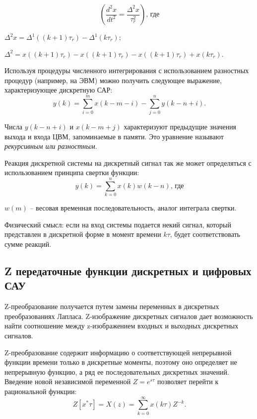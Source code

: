 \documentclass[unicode, 12pt, a4paper, oneside]{article}
\begin{document}
\begin{equation}
\left( \dfrac{d^2x}{dt^2} = \dfrac{\Delta^2x}{\tau^2_r} \right) \text{, где}
\end{equation}
\par $ \Delta^2x = \Delta^1((k + 1)\tau_r) - \Delta^1(k\tau_r) $;\nopagebreak
\par $ \Delta^2 = x((k + 1)\tau_r) - x((k + 1)\tau_r) - x((k + 1)\tau_r) + x(k\tau_r) $.

Используя процедуры численного интегрирования с использованием разностных процедур (например, на ЭВМ) можно получить следующее выражение, характеризующее дискретную САР:
\begin{equation}
y(k) = \sum_{i=0}^{m} x(k-m-i) - \sum_{j=0}^{n} y(k-n+i).
\end{equation}

Числа $y(k-n+i)$ и $x(k-m+j)$ характеризуют предыдущие значения выхода и входа ЦВМ, запоминаемые в памяти. Это уравнение называют \textit{рекурсивным или разностным}.

Реакция дискретной системы на дискретный сигнал так же может определяться с использованием принципа свертки функции:
\begin{equation}
y(k) = \sum_{k=0}^{n} x(k) w(k-n)\text{, где}
\end{equation}
\par $w(m)$ – весовая временная последовательность, аналог интеграла свертки.

Физический смысл: если на вход системы подается некий сигнал, который представлен в дискретной форме в момент времени $ k\tau $, будет соответствовать сумме реакций.

\subsection*{Z передаточные функции дискретных и цифровых САУ}

Z-преобразование получается путем замены переменных в дискретных преобразованиях Лапласа. Z-изображение дискретных сигналов дает возможность найти соотношение между z-изображением входных и выходных дискретных сигналов.

Z-преобразование содержит информацию о соответствующей непрерывной  функции времени только в дискретные моменты, поэтому оно определяет не непрерывную функцию, а ряд ее последовательных дискретных значений. Введение новой независимой переменной $ Z=e^{s\tau} $ позволяет перейти к рациональной функции:
\begin{equation}
Z[x^*\tau] = X(z) = \sum_{k=0}^{\infty} x(k\tau) Z^{-k}.
\end{equation}
\end{document}
